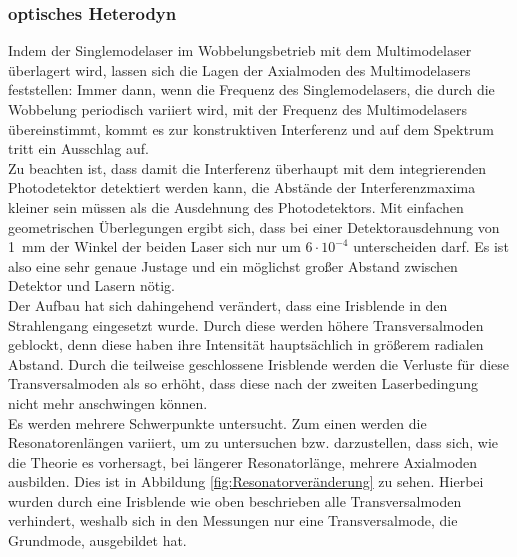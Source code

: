 \documentclass[a4paper,twoside,final]{article}
\begin{document}
\subsubsection{optisches Heterodyn}
Indem der Singlemodelaser im Wobbelungsbetrieb mit dem Multimodelaser überlagert wird, lassen sich die Lagen der Axialmoden des Multimodelasers feststellen: Immer dann, wenn die Frequenz des Singlemodelasers, die durch die Wobbelung periodisch variiert wird, mit der Frequenz des Multimodelasers übereinstimmt, kommt es zur konstruktiven Interferenz und auf dem Spektrum tritt ein Ausschlag auf. \\
Zu beachten ist, dass damit die Interferenz überhaupt mit dem integrierenden Photodetektor detektiert werden kann, die Abstände der Interferenzmaxima kleiner sein müssen als die Ausdehnung des Photodetektors. Mit einfachen geometrischen Überlegungen ergibt sich, dass bei einer Detektorausdehnung von \SI{1}{\milli\meter} der Winkel der beiden Laser sich nur um $6\cdot 10^{-4}$ unterscheiden darf. Es ist also eine sehr genaue Justage und ein möglichst großer Abstand zwischen Detektor und Lasern nötig. \\
Der Aufbau hat sich dahingehend verändert, dass eine Irisblende in den Strahlengang eingesetzt wurde. Durch diese werden höhere Transversalmoden geblockt, denn diese haben ihre Intensität hauptsächlich in größerem radialen Abstand. Durch die teilweise geschlossene Irisblende werden die Verluste für diese Transversalmoden als so erhöht, dass diese nach der zweiten Laserbedingung nicht mehr anschwingen können. \\
Es werden mehrere Schwerpunkte untersucht. Zum einen werden die Resonatorenlängen variiert, um zu untersuchen bzw. darzustellen, dass sich, wie die Theorie es vorhersagt, bei längerer Resonatorlänge, mehrere Axialmoden ausbilden. Dies ist in Abbildung \ref{fig:Resonatorveränderung} zu sehen. Hierbei wurden durch eine Irisblende wie oben beschrieben alle Transversalmoden verhindert, weshalb sich in den Messungen nur eine Transversalmode, die Grundmode, ausgebildet hat.
\end{document}
